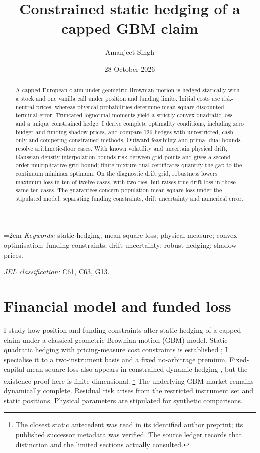 \documentclass[11pt]{article}
\title{Constrained static hedging of a capped GBM claim}
\author{Amanjeet Singh}
\date{28 October 2026}
\begin{document}
\maketitle
\begin{abstract}
\noindent
A capped European claim under geometric Brownian motion is hedged statically
with a stock and one vanilla call under position and funding limits. Initial
costs use risk-neutral prices, whereas physical probabilities determine
mean-square discounted terminal error. Truncated-lognormal moments yield
a strictly convex quadratic loss and a unique constrained hedge. I derive
complete optimality conditions, including zero budget and funding shadow
prices, and compare 126 hedges with unrestricted, cash-only and competing
constrained methods. Outward feasibility and primal-dual bounds resolve
arithmetic-floor cases. With known volatility and uncertain physical drift,
Gaussian density interpolation bounds risk between grid points and gives
a second-order multiplicative grid bound; finite-mixture dual certificates
quantify the gap to the continuum minimax optimum. On the diagnostic drift
grid, robustness lowers maximum loss in ten of twelve cases, with two ties,
but raises true-drift loss in those same ten cases. The guarantees concern
population mean-square loss under the stipulated model, separating funding
constraints, drift uncertainty and numerical error.
\end{abstract}
\noindent\begin{minipage}{\linewidth}
\small\emergencystretch=2em
\textit{Keywords:} static hedging; mean-square loss; physical measure;
convex optimisation; funding constraints; drift uncertainty; robust hedging;
shadow prices.\par
\smallskip\textit{JEL classification:} C61, C63, G13.\par
\end{minipage}
\section{Financial model and funded loss}
\label{sec:h-model}

I study how position and funding constraints alter static hedging of a
capped claim under a classical geometric Brownian motion (GBM) model.
Static quadratic hedging with pricing-measure cost constraints is
established \citep{leunglorig2016}; I specialise it to a two-instrument
basis and a fixed no-arbitrage premium. Fixed-capital mean-square loss
also appears in constrained dynamic hedging \citep{czichowskyschweizer2012},
but the existence proof here is finite-dimensional.
\footnote{The closest static antecedent was read in its identified author
preprint; its published successor metadata was verified. The source ledger
records that distinction and the limited sections actually consulted.}
The underlying GBM market remains dynamically complete. Residual risk
arises from the restricted instrument set and static positions. Physical
parameters are stipulated for synthetic comparisons.
\end{document}

